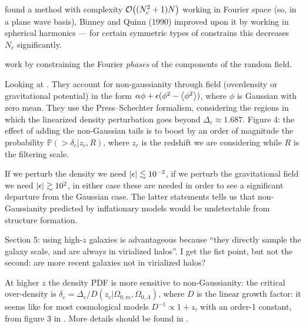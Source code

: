 \documentclass[main.tex]{subfiles}
\begin{document}
\textcite[]{bertschingerPathIntegralMethods1987} found a method with complexity \(\order{(N_c^2 + 1) N}\) working in Fourier space (so, in a plane wave basis), 
Binney and Quinn (1990) improved upon it by working in spherical harmonics --- 
for certain symmetric types of constrains this decreases \(N_c\) significantly. 

\textcite[]{hoffmanConstrainedRealizationsGaussian1991} work by constraining the Fourier \emph{phases} of the components of the random field. 


Looking at \cite[]{matarreseAbundanceHighRedshift2000}. 
They account for non-gaussianity through field (overdensity or gravitational potential) in the form \(\alpha \phi + \epsilon (\phi^2 - \expval{\phi^2 }) \), where \(\phi \) is Gaussian with zero mean. 
They use the Press–Schechter formalism, considering the regions in which the linearized density perturbation  goes beyond \(\Delta  _c \approx 1.687\).
Figure 4: the effect of adding the non-Gaussian tails is to boost by an order of magnitude the probability \(\mathbb{P}(> \delta _c | z_c, R)\), where \(z_c\) is the redshift we are considering while \(R\) is the filtering scale. 

If we perturb the density we need \(\abs{\epsilon} \lesssim \num{e-2}\), if we perturb the gravitational field we need \(\abs{\epsilon } \gtrsim \num{e2}\), in either case these are needed in order to see a significant departure from the Gaussian case. 
The latter statements tells us that non-Gaussianity predicted by inflationary models would be undetectable from structure formation. 


Section 5: using high-\(z\) galaxies is advantageous because ``they directly sample the galaxy scale, and are always in virialized halos''. I get the fist point, but not the second: are more recent galaxies not in virialized halos? 

At higher \(z\) the density PDF is more sensitive to non-Gaussianity: the critical over-density is \(\delta _c = \Delta _c / D(z_c  | \Omega_{0, m}, \Omega_{0, \Lambda })\), where \(D\) is the linear growth factor: it seems like for most cosmological models \(D^{-1} \propto 1+z\), with an order-1 constant, from figure 3 in \cite[]{matarreseAbundanceHighRedshift2000}. 
More details should be found in \cite[]{hamiltonFormulaeGrowthFactors2001
}. 
\end{document}
